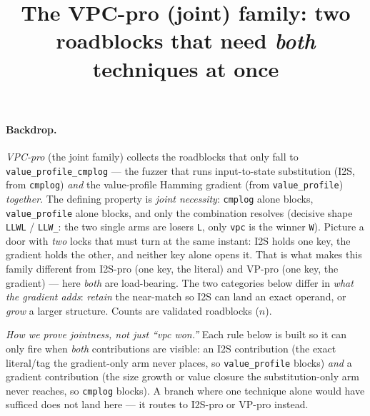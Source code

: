 \documentclass[11pt]{article}
\title{\textbf{The VPC-pro (joint) family: two roadblocks that need \emph{both} techniques at once}}
\author{}
\date{}
\begin{document}
\maketitle
\vspace{-3em}

\paragraph{Backdrop.} \emph{VPC-pro} (the joint family) collects the roadblocks
that only fall to \texttt{value\_profile\_cmplog} --- the fuzzer that runs
input-to-state substitution (I2S, from \texttt{cmplog}) \emph{and} the
value-profile Hamming gradient (from \texttt{value\_profile}) \emph{together}.
The defining property is \emph{joint necessity}: \texttt{cmplog} alone blocks,
\texttt{value\_profile} alone blocks, and only the combination resolves
(decisive shape \texttt{LLWL} / \texttt{LLW\_}: the two single arms are losers
\texttt{L}, only \texttt{vpc} is the winner \texttt{W}). Picture a door with
\emph{two} locks that must turn at the same instant: I2S holds one key, the
gradient holds the other, and neither key alone opens it. That is what makes
this family different from I2S-pro (one key, the literal) and VP-pro (one key,
the gradient) --- here \emph{both} are load-bearing. The two categories below
differ in \emph{what the gradient adds}: \emph{retain} the near-match so I2S can
land an exact operand, or \emph{grow} a larger structure. Counts are validated
roadblocks ($n$).

\smallskip\noindent\textit{How we prove jointness, not just ``vpc won.''} Each
rule below is built so it can only fire when \emph{both} contributions are
visible: an I2S contribution (the exact literal/tag the gradient-only arm never
places, so \texttt{value\_profile} blocks) \emph{and} a gradient contribution
(the size growth or value closure the substitution-only arm never reaches, so
\texttt{cmplog} blocks). A branch where one technique alone would have sufficed
does not land here --- it routes to I2S-pro or VP-pro instead.

\end{document}
